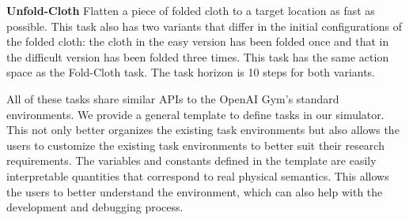 \textbf{Unfold-Cloth} Flatten a piece of folded cloth to a target location as fast as possible. This task also has two variants that differ in the initial configurations of the folded cloth: the cloth in the easy version has been folded once and that in the difficult version has been folded three times.
This task has the same action space as the Fold-Cloth task. The task horizon is 10 steps for both variants.

All of these tasks share similar APIs to the OpenAI Gym's standard environments. We provide a general template to define tasks in our simulator. This not only better organizes the existing task environments but also allows the users to customize the existing task environments to better suit their research requirements. The variables and constants defined in the template are easily interpretable quantities that correspond to real physical semantics. This allows the users to better understand the environment, which can also help with the development and debugging process. 


 
 
